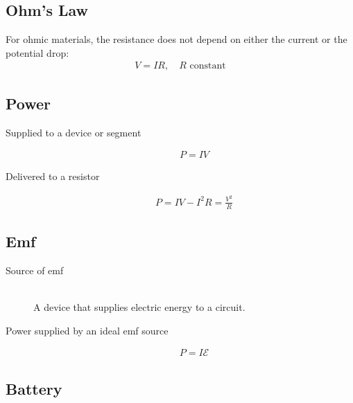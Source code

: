 \documentclass[../main.tex]{subfiles}
\begin{document}
\subsection{Ohm's Law}
\label{sub:ohm_s_law}

For ohmic materials, the resistance does not depend on either the current or
the potential drop:
\begin{align}
  V = IR,\quad R \text{ constant}
\end{align}

\subsection{Power}
\label{sub:power}

\begin{description}
  \item[Supplied to a device or segment]
    \begin{align}
       P = IV
    \end{align}
  \item[Delivered to a resistor]
    \begin{align}
      P = IV - I^2R=\frac{V^2}{R}
    \end{align}
\end{description}

\subsection{Emf}
\label{sub:emf}

\begin{description}
  \item[Source of emf] \hfill \\
    A device that supplies electric energy to a circuit.
  \item[Power supplied by an ideal emf source]
    \begin{align}
      P = I\mathcal{E}
    \end{align}
\end{description}

\subsection{Battery}
\label{sub:battery}
\end{document}
